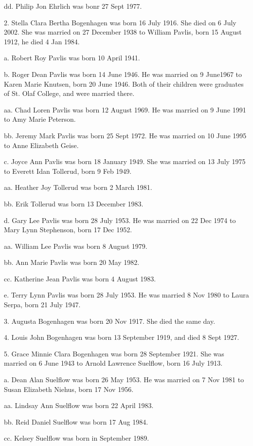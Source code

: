 \documentclass[a4paper]{article}
\begin{document}
dd. Philip Jon Ehrlich was bonr 27 Sept 1977.

2. Stella Clara Bertha Bogenhagen was born 16 July 1916. She died on 6 July 2002.  She was married on 27 December 1938 to William Pavlis, born 15 August 1912, he died 4 Jan 1984.

a. Robert Roy Pavlis was born 10 April 1941.

b. Roger Dean Pavlis was born 14 June 1946.  He was married on 9 June1967 to Karen Marie Knutsen, born 20 June 1946.  Both of their children were graduates of St. Olaf College, and were married there.

aa. Chad Loren Pavlis was born 12 August 1969.  He was married on 9 June 1991 to Amy Marie Peterson.

bb. Jeremy Mark Pavlis was born 25 Sept 1972.  He was married on 10 June 1995 to Anne Elizabeth Geise.

c. Joyce Ann Pavlis was born 18 January 1949.  She was married on 13 July 1975 to Everett Idan Tollerud, born 9 Feb 1949.

aa. Heather Joy Tollerud was born 2 March 1981.

bb. Erik Tollerud was born 13 December 1983.  

d. Gary Lee Pavlis was born 28 July 1953.  He was married on 22 Dec 1974 to Mary Lynn Stephenson, born 17 Dec 1952.
 
aa. William Lee Pavlis was born 8 August 1979.

bb. Ann Marie Pavlis was born 20 May 1982.

cc. Katherine Jean Pavlis was born 4 August 1983.

e. Terry Lynn Pavlis was born 28 July 1953.  He was married 8 Nov 1980 to Laura Serpa, born 21 July 1947.

3. Augusta Bogenhagen was born 20 Nov 1917. She died the same day.

4. Louis John Bogenhagen was born 13 September 1919, and died 8 Sept 1927.

5. Grace Minnie Clara Bogenhagen was born 28 September 1921.  She was married on 6 June 1943 to Arnold Lawrence Suelflow, born 16 July 1913.

a. Dean Alan Suelflow was born 26 May 1953.  He was married on 7 Nov 1981 to Susan Elizabeth Niehus, born 17 Nov 1956.

aa. Lindsay Ann Suelflow was born 22 April 1983.

bb. Reid Daniel Suelflow was born 17 Aug 1984.

cc. Kelsey Suelflow was born in September 1989.
\end{document}
